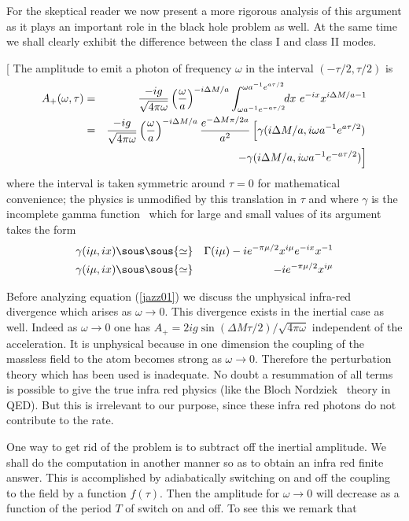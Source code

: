 \documentclass[12pt,oneside]{report}
\def\mettresous#1\sous#2{\mathrel{\mathop{\kern0pt #2}\limits_{#1}}}
\def\om{\omega	}
\begin{document}
For the skeptical reader we now present a more rigorous analysis of this
argument as it plays an important role in the black hole problem as well. At
the same time we shall clearly exhibit the difference between the class I and
class II modes.

[
The amplitude to emit a photon of frequency $\omega$ 
in the interval $(-\tau/2, \tau/2)$ is 
\begin{eqnarray}
A_+(\omega, \tau) &=&
{-i g\over \sqrt{4 \pi \omega}}
\left( {\omega \over a} \right)^{-i \Delta M/a}
\int_{\omega a^{-1} e^{-a \tau/2}}^{\omega a^{-1} e^{a
\tau/2}}
\! \!dx\  e^{-ix} x^{i \Delta M/ a -1}
\label{jazz00}\\
&=&{-i g\over \sqrt{4 \pi \omega}}
\left( {\omega \over a} \right)^{-i \Delta M/a}
{e^{-\Delta M \pi / 2 a} \over a^2}
\left[ \gamma(i\Delta M /a , i \omega a^{-1} e^{a
\tau/2} ) \right.\nonumber\\&\ &\quad\quad\quad
\left. -\gamma(i\Delta M /a , i \omega a^{-1} e^{-a
\tau/2} )  \right]
\label{jazz01}
\end{eqnarray}
 where the interval is
taken symmetric around $\tau=0$ for mathematical
convenience; the physics is unmodified by this
translation in $\tau$ and where 
$\gamma$ is the incomplete gamma function~\cite{WiWa} which for large
and small values of its argument takes the form
\begin{eqnarray}
\gamma(i\mu , ix) &\mettresous{x \to \infty}\sous{\simeq}& 
\Gamma(i \mu) - i e^{- \pi \mu / 2}
x^{i \mu} e^{-ix} x^{-1}
\label{jazz02}
\\
\gamma(i\mu , ix) &\mettresous{x \to 0}\sous{\simeq}&  - i e^{- \pi \mu / 2}
x^{i \mu}
\label{jazz03}
\end{eqnarray}

Before analyzing equation (\ref{jazz01}) we discuss the unphysical infra-red
divergence which arises as $\om\to 0$. This divergence exists in the inertial
case as well. Indeed as $\om \to 0$ one has $A_+=2 i g \sin(\Delta M \tau /2 )
/\sqrt{4 \pi \omega}$ independent of the acceleration. It is unphysical
because in one dimension the coupling of the massless field to the atom
becomes strong as $\om \to 0$. Therefore the perturbation theory which has
been used is inadequate. No doubt a resummation of all terms is possible to
give the true infra red physics (like the Bloch Nordziek~\cite{BochN} theory
in QED). But this is irrelevant to our purpose, since these infra red photons
do not contribute to the rate.

One way to get rid of the problem is to subtract off the inertial amplitude. We
shall do the computation in another manner so as to obtain an infra red finite
answer. This is accomplished by adiabatically 
switching on and off the coupling to the field by a 
function $f(\tau)$.
 Then the amplitude
for $\om \to 0$ will decrease as a function of the period $T$ of switch on and
off. To see this we remark that 
\end{document}
